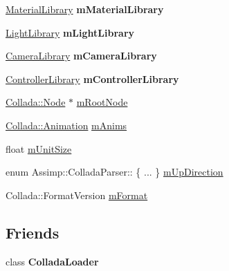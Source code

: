 \begin{DoxyCompactItemize}
\item 
\hypertarget{class_assimp_1_1_collada_parser_a548792ef6c647d999dcfee731a0f8277}{\hyperlink{class_assimp_1_1_collada_parser_ade2fe0008281313e1e5d4ba71fc8f0aa}{Material\+Library} {\bfseries m\+Material\+Library}}\label{class_assimp_1_1_collada_parser_a548792ef6c647d999dcfee731a0f8277}

\item 
\hypertarget{class_assimp_1_1_collada_parser_a366a49acaba9da1e68142e574a2b6e65}{\hyperlink{class_assimp_1_1_collada_parser_a873173a2311c52691fb25d153f376542}{Light\+Library} {\bfseries m\+Light\+Library}}\label{class_assimp_1_1_collada_parser_a366a49acaba9da1e68142e574a2b6e65}

\item 
\hypertarget{class_assimp_1_1_collada_parser_acd4d614ca7181cfce184889cc664702c}{\hyperlink{class_assimp_1_1_collada_parser_a682434e214b9d9831166f0ac55b1aed4}{Camera\+Library} {\bfseries m\+Camera\+Library}}\label{class_assimp_1_1_collada_parser_acd4d614ca7181cfce184889cc664702c}

\item 
\hypertarget{class_assimp_1_1_collada_parser_afc8255946f9f58148fdfecbc293aa272}{\hyperlink{class_assimp_1_1_collada_parser_a2e216f3a8cc9f2953967c5ae59bed7c9}{Controller\+Library} {\bfseries m\+Controller\+Library}}\label{class_assimp_1_1_collada_parser_afc8255946f9f58148fdfecbc293aa272}

\item 
\hyperlink{struct_assimp_1_1_collada_1_1_node}{Collada\+::\+Node} $\ast$ \hyperlink{class_assimp_1_1_collada_parser_aaa1d9b95575cdc3312544f22e38ba497}{m\+Root\+Node}
\item 
\hyperlink{struct_assimp_1_1_collada_1_1_animation}{Collada\+::\+Animation} \hyperlink{class_assimp_1_1_collada_parser_a4cf75e2eba91d97c265b165e30bcb220}{m\+Anims}
\item 
float \hyperlink{class_assimp_1_1_collada_parser_a5fb8bcd2987a267f75ad6a545b664fea}{m\+Unit\+Size}
\item 
enum Assimp\+::\+Collada\+Parser\+:: \{ ... \}  \hyperlink{class_assimp_1_1_collada_parser_a485cfd9e616deb9dfbc64095543aecf3}{m\+Up\+Direction}
\item 
Collada\+::\+Format\+Version \hyperlink{class_assimp_1_1_collada_parser_a519c82e2ac698efb01663da278ad2e40}{m\+Format}
\end{DoxyCompactItemize}
\subsection*{Friends}
\begin{DoxyCompactItemize}
\item 
\hypertarget{class_assimp_1_1_collada_parser_a8170d72d85780f69be2f95a5337c5813}{class {\bfseries Collada\+Loader}}\label{class_assimp_1_1_collada_parser_a8170d72d85780f69be2f95a5337c5813}

\end{DoxyCompactItemize}


